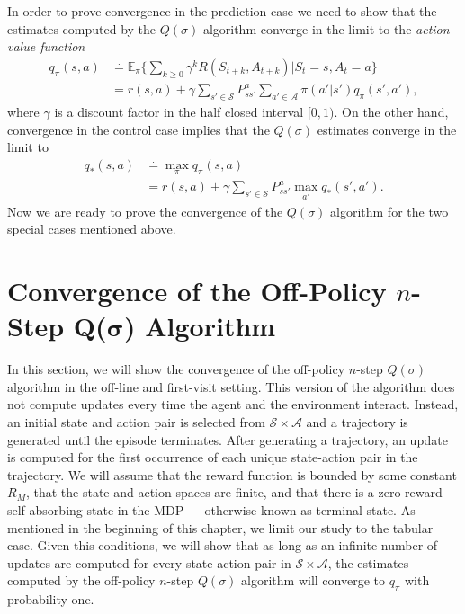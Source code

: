 In order to prove convergence in the prediction case we need to show that the estimates computed by the $Q(\sigma)$ algorithm converge in the limit to the \textit{action-value function}
%
\begin{align}
\label{eq:qpi}
q_\pi(s,a) &\overset{.}{=} \mathbb{E}_{\pi}  
	\Big\{ \sum_{k \geq 0} \gamma^k R(S_{t+k}, A_{t+k}) | S_t= s, A_t = a \Big\} \nonumber \\
&= r(s,a) + \gamma \sum_{s' \in \mathcal{S}} P^a_{ss'} \sum_{a' \in \mathcal{A}} \pi(a'|s') 
	q_\pi(s',a'),
\end{align}
%
where $\gamma$ is a discount factor in the half closed interval $[0,1)$. 
On the other hand, convergence in the control case implies that the $Q(\sigma)$ estimates converge in the limit to
%
\begin{align}
\label{eq:qstar}
q_*(s,a) &\overset{.}{=} \max_\pi q_\pi(s,a) \nonumber \\
%
&= r(s,a) + \gamma  \sum_{s' \in \mathcal{S}} P^a_{ss'} \max_{a'}q_*(s',a').
\end{align}
%
Now we are ready to prove the convergence of the $Q(\sigma)$ algorithm for the two special cases mentioned above.

\section{Convergence of the Off-Policy $n$-Step Q($\boldsymbol{\sigma}$) Algorithm}
\label{section:offpolicy_conv} 

In this section, we will show the convergence of the off-policy $n$-step $Q(\sigma)$ algorithm in the off-line and first-visit setting.
This version of the algorithm does not compute updates every time the agent and the environment interact. 
Instead, an initial state and action pair is selected from $\mathcal{S} \times \mathcal{A}$ and a trajectory is generated until the episode terminates.
After generating a trajectory, an update is computed for the first occurrence of each unique state-action pair in the trajectory.
We will assume that the reward function is bounded by some constant $R_M$, that the state and action spaces are finite, and that there is a zero-reward self-absorbing state in the MDP --- otherwise known as terminal state.
As mentioned in the beginning of this chapter, we limit our study to the tabular case.
Given this conditions, we will show that as long as an infinite number of updates are computed for every state-action pair in $\mathcal{S} \times \mathcal{A}$, the estimates computed by the off-policy $n$-step $Q(\sigma)$ algorithm will converge to $q_\pi$ with probability one.

